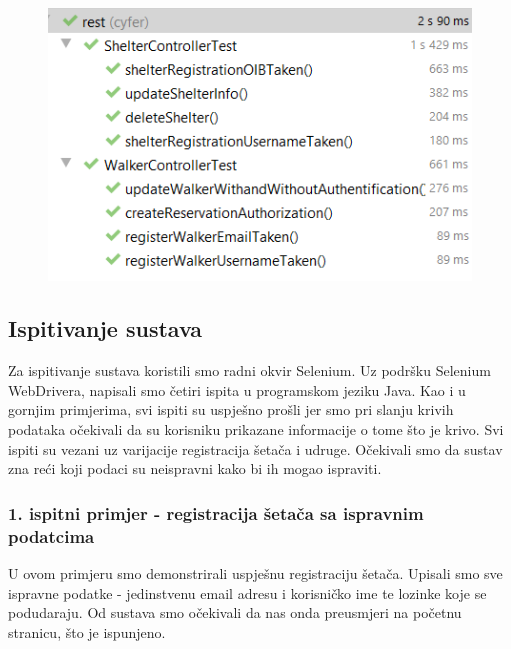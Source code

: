 			\begin{figure}[H]
				\includegraphics[scale=0.75]{slike/UnitRezultati.PNG}
				\centering
			\end{figure}
			
			\newpage	
			
			
			\subsection{Ispitivanje sustava}
			
				Za ispitivanje sustava koristili smo radni okvir Selenium. Uz podršku Selenium WebDrivera, napisali smo četiri ispita u programskom jeziku Java. Kao i u gornjim primjerima, svi ispiti su uspješno prošli jer smo pri slanju krivih podataka očekivali da su korisniku prikazane informacije o tome što je krivo. Svi ispiti su vezani uz varijacije registracija šetača i udruge. Očekivali smo da sustav zna reći koji podaci su neispravni kako bi ih mogao ispraviti.
			
			\subsubsection{1. ispitni primjer - registracija šetača sa ispravnim podatcima}
			
				U ovom primjeru smo demonstrirali uspješnu registraciju šetača. Upisali smo sve ispravne podatke - jedinstvenu email adresu i korisničko ime te lozinke koje se podudaraju. Od sustava smo očekivali da nas onda preusmjeri na početnu stranicu, što je ispunjeno.
				
